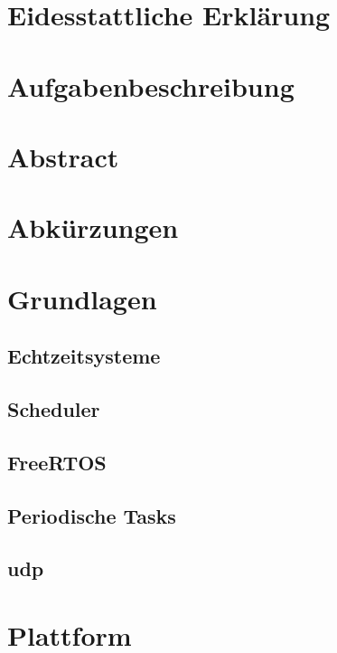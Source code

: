 \documentclass{scrartcl}
\begin{document}
	\begin{titlepage}
		
	\end{titlepage}
	\clearpage 
	\section*{Eidesstattliche Erklärung}
		
		\clearpage
	\section*{Aufgabenbeschreibung}
		
		\clearpage
	\section*{Abstract}
		
		\clearpage
	\tableofcontents
		\clearpage
	\section*{Abkürzungen}
		
		\clearpage
	\clearpage
	\section{Grundlagen}
		
		\subsection{Echtzeitsysteme}
			
		\subsection{Scheduler}
			
		\subsection{FreeRTOS}
			
		\subsection{Periodische Tasks}
			
		\subsection{\ac{udp}}
			
		\clearpage
	\section{Plattform}
		
		\clearpage
	\listoffigures
		\clearpage
	\listoftables
		\printbibliography{}
		\clearpage
\end{document}
